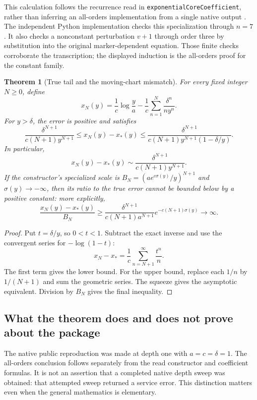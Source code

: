 \documentclass[11pt,letterpaper]{article}
\newtheorem{theorem}{Theorem}
\newcommand{\code}[1]{\texttt{#1}}
\begin{document}
This calculation follows the recurrence read in \code{exponentialCoreCoefficient}, rather than inferring an all-orders implementation from a single native output \cite{expcore}. The independent Python implementation checks this specialization through $n=7$. It also checks a nonconstant perturbation $v+1$ through order three by substitution into the original marker-dependent equation. Those finite checks corroborate the transcription; the displayed induction is the all-orders proof for the constant family.

\begin{theorem}[True tail and the moving-chart mismatch]\label{thm:tail}
For every fixed integer $N\geq0$, define
\[
 x_N(y)=\frac1c\log\frac{y}{a}
       -\frac1c\sum_{n=1}^{N}\frac{\delta^n}{n y^n}.
\]
For $y>\delta$, the error is positive and satisfies
\begin{equation}\label{eq:tail-bounds}
 \frac{\delta^{N+1}}{c(N+1)y^{N+1}}
 \leq x_N(y)-x_*(y)
 \leq
 \frac{\delta^{N+1}}{c(N+1)y^{N+1}(1-\delta/y)}.
\end{equation}
In particular,
\[
 x_N(y)-x_*(y)\sim
 \frac{\delta^{N+1}}{c(N+1)y^{N+1}}.
\]
If the constructor's specialized scale is $B_N=(a e^{c\sigma(y)}/y)^{N+1}$ and $\sigma(y)\to-\infty$, then its ratio to the true error cannot be bounded below by a positive constant: more explicitly,
\[
 \frac{x_N(y)-x_*(y)}{B_N}
 \geq\frac{\delta^{N+1}}{c(N+1)a^{N+1}}
       e^{-c(N+1)\sigma(y)}\longrightarrow\infty.
\]
\end{theorem}
\begin{proof}
Put $t=\delta/y$, so $0<t<1$. Subtract the exact inverse and use the convergent series for $-\log(1-t)$:
\[
 x_N-x_* =\frac1c\sum_{n=N+1}^{\infty}\frac{t^n}{n}.
\]
The first term gives the lower bound. For the upper bound, replace each $1/n$ by $1/(N+1)$ and sum the geometric series. The squeeze gives the asymptotic equivalent. Division by $B_N$ gives the final inequality.
\end{proof}

\subsection{What the theorem does and does not prove about the package}
The native public reproduction was made at depth one with $a=c=\delta=1$. The all-orders conclusion follows separately from the read constructor and coefficient formulas. It is not an assertion that a completed native depth sweep was obtained: that attempted sweep returned a service error. This distinction matters even when the general mathematics is elementary.
\end{document}
